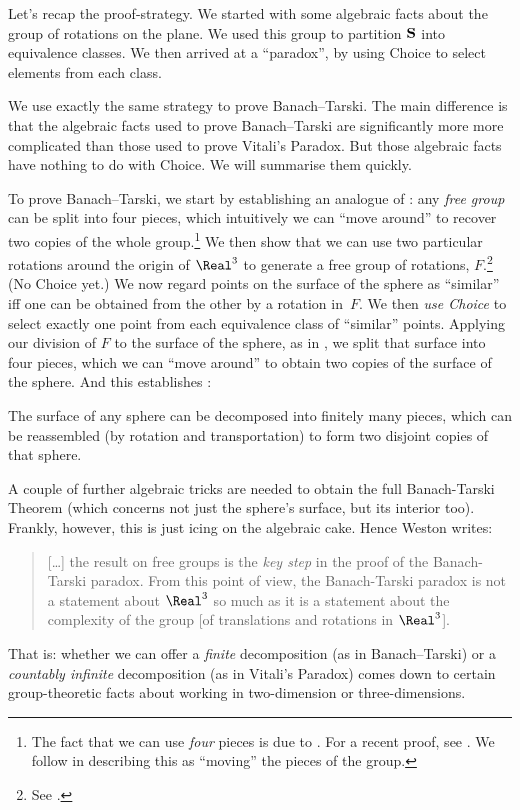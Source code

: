 \documentclass[../../../include/open-logic-section]{subfiles}
\begin{document}
Let's recap the proof-strategy. We started with some algebraic facts
about the group of rotations on the plane. We used this group to
partition $\mathbf{S}$ into equivalence classes. We then arrived at a
``paradox'', by using Choice to select elements from each class.

We use exactly the same strategy to prove Banach--Tarski. The main
difference is that the algebraic facts used to prove Banach--Tarski
are significantly more more complicated than those used to prove
Vitali's Paradox. But those algebraic facts have nothing to do with
Choice. We will summarise them quickly. 

To prove Banach--Tarski, we start by establishing an analogue of
: any \emph{free group} can be split into four
pieces, which intuitively we can ``move around'' to recover two copies
of the whole group.\footnote{The fact that we can use \emph{four}
pieces is due to \cite{Robinson1947}. For a recent proof, see
\citet[Theorem 5.2]{Wagon2016}. We follow \citet[p.~3]{Weston2003}
in describing this as ``moving'' the pieces of the group.} We then
show that we can use two particular rotations around the origin of
$\Real^3$ to generate a free group of rotations, $F$.\footnote{See
\citet[Theorem 2.1]{Wagon2016}.} (No Choice yet.) We now regard points
on the surface of the sphere as ``similar'' iff one can be obtained
from the other by a rotation in~$F$. We then \emph{use Choice} to
select exactly one point from each equivalence class of ``similar''
points. Applying our division of $F$ to the surface of the sphere, as
in , we split that surface into four pieces,
which we can ``move around'' to obtain two copies of the surface of
the sphere. And this establishes \citep{Hausdorff1914}:

\begin{thm} 
The surface of any sphere can be decomposed into finitely many pieces,
which can be reassembled (by rotation and transportation) to form two
disjoint copies of that sphere.
\end{thm}

A couple of further algebraic tricks are needed to obtain the full
Banach-Tarski Theorem (which concerns not just the sphere's surface,
but its interior too). Frankly, however, this is just icing on the
algebraic cake. Hence Weston writes:
\begin{quote}	
  [\ldots] the result on free groups is the \emph{key step} in the
  proof of the Banach-Tarski paradox. From this point of view, the
  Banach-Tarski paradox is not a statement about $\Real^3$ so much as
  it is a statement about the complexity of the group [of translations
  and rotations in $\Real^3$]. \cite[p.~16]{Weston2003}
\end{quote}
That is: whether we can offer a \emph{finite} decomposition (as in
Banach--Tarski) or a \emph{countably infinite} decomposition (as in
Vitali's Paradox) comes down to certain group-theoretic facts about
working in two-dimension or three-dimensions.
\end{document}
